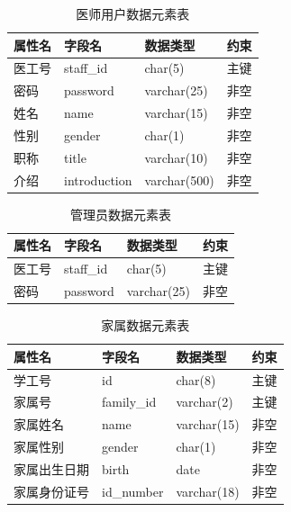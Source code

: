 \documentclass{article}
\begin{document}
\begin{table}[H]
    \centering
    \begin{tabularx}{\textwidth}{|>{\raggedright\arraybackslash}X|>{\raggedright\arraybackslash}X|>{\raggedright\arraybackslash}X|>{\raggedright\arraybackslash}X|}
    \toprule
    \textbf{属性名} & \textbf{字段名} & \textbf{数据类型} & \textbf{约束} \\ \midrule
    医工号 & staff\_id & char(5) & 主键 \\ \midrule
    密码 & password & varchar(25) & 非空 \\ \midrule
    姓名 & name & varchar(15) & 非空 \\ \midrule
    性别 & gender & char(1) & 非空 \\ \midrule
    职称 & title & varchar(10) & 非空 \\ \midrule
    介绍 & introduction & varchar(500) & 非空 \\ \bottomrule
    \end{tabularx}
    \caption{医师用户数据元素表}
    \label{tab:doctor_user_elements}
\end{table}

\begin{table}[H]
    \centering
    \begin{tabularx}{\textwidth}{|>{\raggedright\arraybackslash}X|>{\raggedright\arraybackslash}X|>{\raggedright\arraybackslash}X|>{\raggedright\arraybackslash}X|}
    \toprule
    \textbf{属性名} & \textbf{字段名} & \textbf{数据类型} & \textbf{约束} \\ \midrule
    医工号 & staff\_id & char(5) & 主键 \\ \midrule
    密码 & password & varchar(25) & 非空 \\ \bottomrule
    \end{tabularx}
    \caption{管理员数据元素表}
    \label{tab:admin_user_elements}
\end{table}

\begin{table}[H]
    \centering
    \begin{tabularx}{\textwidth}{|>{\raggedright\arraybackslash}X|>{\raggedright\arraybackslash}X|>{\raggedright\arraybackslash}X|>{\raggedright\arraybackslash}X|}
    \toprule
    \textbf{属性名} & \textbf{字段名} & \textbf{数据类型} & \textbf{约束} \\ \midrule
    学工号 & id & char(8) & 主键 \\ \midrule
    家属号 & family\_id & varchar(2) & 主键 \\ \midrule
    家属姓名 & name & varchar(15) & 非空 \\ \midrule
    家属性别 & gender & char(1) & 非空 \\ \midrule
    家属出生日期 & birth & date & 非空 \\ \midrule
    家属身份证号 & id\_number & varchar(18) & 非空 \\ \bottomrule
    \end{tabularx}
    \caption{家属数据元素表}
    \label{tab:family_user_elements}
\end{table}
\end{document}
